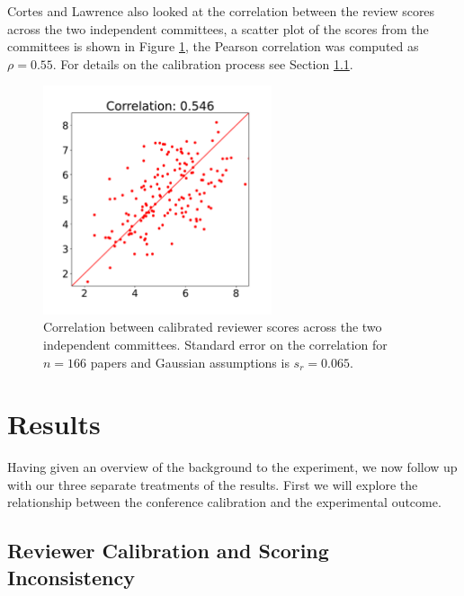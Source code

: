 \documentclass[twoside]{article}
\begin{document}
Cortes and Lawrence also looked at the correlation between the review scores across the two independent committees, a scatter plot of the scores from the committees is shown in Figure \ref{figure-calibrated-quality-correlation}, the Pearson correlation was computed as $\rho=0.55$. For details on the calibration process see Section \ref{reviewer-calibration-and-scoring-inconsistency}.

\begin{figure}[htb]
\includegraphics[width=0.60\textwidth]{diagrams/neurips/calibrated-quality-correlation.pdf}

\caption{Correlation between calibrated reviewer scores across the two independent committees. Standard error on the correlation for $n=166$ papers and Gaussian assumptions is $s_r = 0.065$.}
\label{figure-calibrated-quality-correlation}
\end{figure}

\section{Results}

Having given an overview of the background to the experiment, we now follow up with our three separate treatments of the results. First we will explore the relationship between the conference calibration and the experimental outcome.

\hypertarget{reviewer-calibration-and-scoring-inconsistency}{%
\subsection{Reviewer Calibration and Scoring Inconsistency}\label{reviewer-calibration-and-scoring-inconsistency}}
\end{document}
